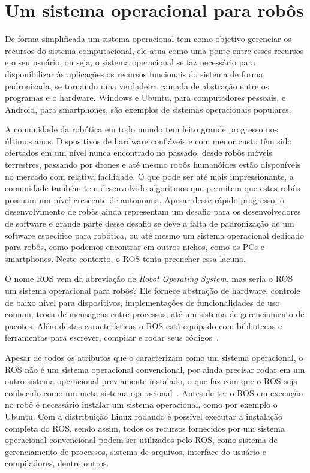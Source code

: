 \section{Um sistema operacional para robôs}

De forma simplificada um sistema operacional tem como objetivo gerenciar os recursos do sistema computacional, ele atua como uma ponte entre esses recursos e o seu usuário, ou seja, o sistema operacional se faz necessário para disponibilizar às aplicações os recursos funcionais do sistema de forma padronizada, se tornando uma verdadeira camada de abstração entre os programas e o hardware. Windows e Ubuntu, para computadores pessoais, e Android, para smartphones, são exemplos de sistemas operacionais populares.

A comunidade da robótica em todo mundo tem feito grande progresso nos últimos anos. Dispositivos de hardware confiáveis e com menor custo têm sido ofertados em um nível nunca encontrado no passado, desde robôs móveis terrestres, passando por drones e até mesmo robôs humanóides estão disponíveis no mercado com relativa facilidade. O que pode ser até mais impressionante, a comunidade também tem desenvolvido algoritmos que permitem que estes robôs possuam um nível crescente de autonomia. Apesar desse rápido progresso, o desenvolvimento de robôs ainda representam um desafio para os desenvolvedores de software e grande parte desse desafio se deve a falta de padronização de um software específico para robótica, ou até mesmo um sistema operacional dedicado para robôs, como podemos encontrar em outros nichos, como os PCs e smartphones. Neste contexto, o ROS tenta preencher essa lacuna.

O nome ROS vem da abreviação de \textit{Robot Operating System}, mas seria o ROS um sistema operacional para robôs? Ele fornece abstração de hardware, controle de baixo nível para dispositivos, implementações de funcionalidades de uso comum, troca de mensagens entre processos, até um sistema de gerenciamento de pacotes. Além destas características o ROS está equipado com bibliotecas e ferramentas para escrever, compilar e rodar seus códigos~\cite{RosIntro}.

Apesar de todos os atributos que o caracterizam como um sistema operacional, o ROS não é um sistema operacional convencional, por ainda precisar rodar em um outro sistema operacional previamente instalado, o que faz com que o ROS seja conhecido como um meta-sistema operacional~\cite{rosPYO}. Antes de ter o ROS em execução no robô é necessário instalar um sistema operacional, como por exemplo o Ubuntu. Com a distribuição Linux rodando é possível executar a instalação completa do ROS, sendo assim, todos os recursos fornecidos por um sistema operacional convencional podem ser utilizados pelo ROS, como sistema de gerenciamento de processos, sistema de arquivos, interface do usuário e compiladores, dentre outros. 

